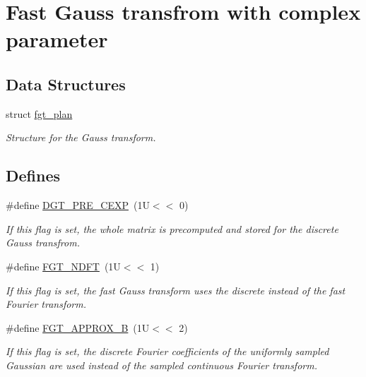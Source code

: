 \hypertarget{group__applications__fastgauss}{
\section{Fast Gauss transfrom with complex parameter}
\label{group__applications__fastgauss}
}
\subsection*{Data Structures}
\begin{CompactItemize}
\item 
struct \hyperlink{structfgt__plan}{fgt\_\-plan}
\begin{CompactList}\small\item\em Structure for the Gauss transform. \item\end{CompactList}\end{CompactItemize}
\subsection*{Defines}
\begin{CompactItemize}
\item 
\#define \hyperlink{group__applications__fastgauss_g48aa1ec81a29b9f079701246f0b53ccc}{DGT\_\-PRE\_\-CEXP}~(1U$<$$<$ 0)
\begin{CompactList}\small\item\em If this flag is set, the whole matrix is precomputed and stored for the discrete Gauss transfrom. \item\end{CompactList}\item 
\#define \hyperlink{group__applications__fastgauss_g38ab7e1022ff3c5b556ce93078a05d1e}{FGT\_\-NDFT}~(1U$<$$<$ 1)
\begin{CompactList}\small\item\em If this flag is set, the fast Gauss transform uses the discrete instead of the fast Fourier transform. \item\end{CompactList}\item 
\#define \hyperlink{group__applications__fastgauss_g39c3e544a78853e0da2b9a8c66d3054d}{FGT\_\-APPROX\_\-B}~(1U$<$$<$ 2)
\begin{CompactList}\small\item\em If this flag is set, the discrete Fourier coefficients of the uniformly sampled Gaussian are used instead of the sampled continuous Fourier transform. \item\end{CompactList}\end{CompactItemize}

